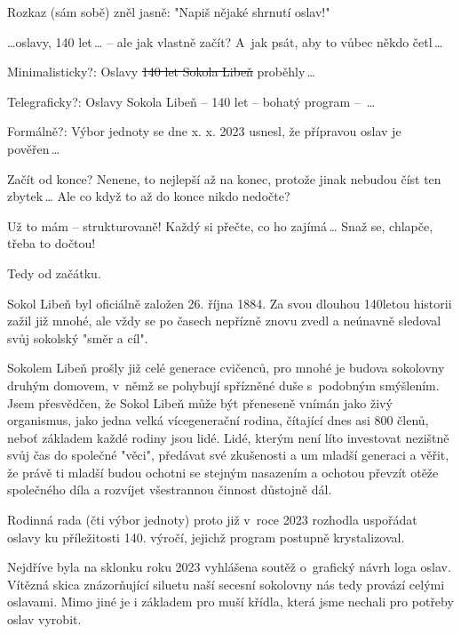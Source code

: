 \documentclass[11pt]{article}
\begin{document}
\clearpage
\nopagecolor
\normalcolor

\restoregeometry
\pagestyle{standard}

Rozkaz (sám sobě) zněl jasně: "Napiš nějaké shrnutí oslav!"

\ldots oslavy, 140 let\,\ldots{} -- ale jak vlastně začít? A~jak psát, aby
to vůbec někdo četl\,\ldots{}

Minimalisticky?: Oslavy \sout{140 let Sokola Libeň} proběhly\,\ldots{}

Telegraficky?: Oslavy Sokola Libeň -- 140 let -- bohatý program --~\ldots{}

Formálně?: Výbor jednoty se dne x. x. 2023 usnesl, že přípravou oslav je
pověřen\,\ldots{}

Začít od konce? Nenene, to nejlepší až na konec, protože jinak nebudou
číst ten zbytek\,\ldots{} Ale co když to až do konce nikdo nedočte?

Už to mám -- strukturovaně! Každý si přečte, co ho zajímá\,\ldots{}
Snaž se, chlapče, třeba to dočtou!

Tedy od začátku.

\vspace*{\baselineskip}

Sokol Libeň byl oficiálně založen 26. října 1884. Za svou dlouhou
140letou historii zažil již mnohé, ale vždy se po časech nepřízně znovu
zvedl a neúnavně sledoval svůj sokolský "směr a cíl".

Sokolem Libeň prošly již celé generace cvičenců, pro mnohé je budova
sokolovny druhým domovem, v~němž se pohybují spřízněné duše s~podobným
smýšlením. Jsem přesvědčen, že Sokol Libeň může být přeneseně vnímán
jako živý organismus, jako jedna velká vícegenerační rodina, čítající
dnes asi 800 členů, neboť základem každé rodiny jsou lidé. Lidé, kterým
není líto investovat nezištně svůj čas do společné "věci", předávat své
zkušenosti a um mladší generaci a věřit, že právě ti mladší budou
ochotni se stejným nasazením a ochotou převzít otěže společného díla a
rozvíjet všestrannou činnost důstojně dál.

Rodinná rada (čti výbor jednoty) proto již v~roce 2023 rozhodla
uspořádat oslavy ku příležitosti 140. výročí, jejichž program postupně
krystalizoval.

Nejdříve byla na sklonku roku 2023 vyhlášena soutěž o~grafický návrh
loga oslav. Vítězná skica znázorňující siluetu naší secesní sokolovny
nás tedy provází celými oslavami. Mimo jiné je i základem pro muší
křídla, která jsme nechali pro potřeby oslav vyrobit.
\end{document}
